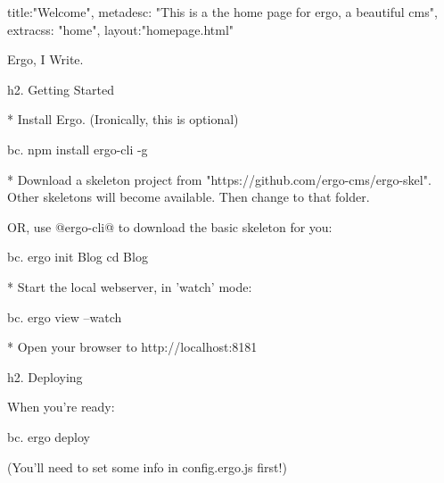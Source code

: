 {
title:"Welcome",
metadesc: "This is a the home page for ergo, a beautiful cms",
extracss: "home",
layout:"homepage.html"
}

Ergo, I Write.

h2. Getting Started

* Install Ergo. (Ironically, this is optional)

bc. npm install ergo-cli -g

* Download a skeleton project from "https://github.com/ergo-cms/ergo-skel". Other skeletons will become available. Then change to that folder.

OR, use @ergo-cli@ to download the basic skeleton for you:

bc. ergo init Blog
cd Blog

* Start the local webserver, in 'watch' mode:

bc. ergo view --watch

* Open your browser to http://localhost:8181

h2. Deploying

When you're ready:

bc. ergo deploy

(You'll need to set some info in config.ergo.js first!)

